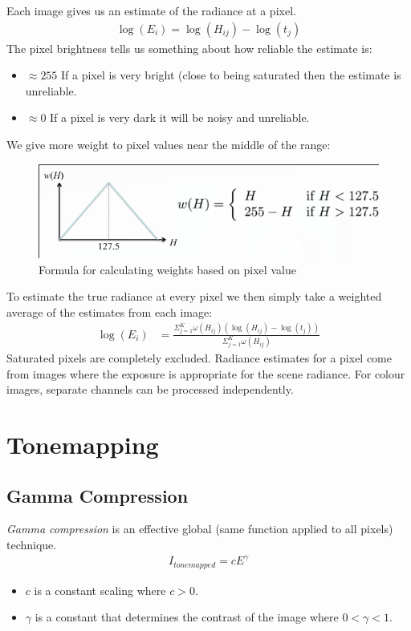 \documentclass{article}
\begin{document}
Each image gives us an estimate of the radiance at a pixel.
\begin{align*}
	\log(E_i) = \log(H_{ij}) - \log(t_j)
\end{align*}
The pixel brightness tells us something about how reliable the estimate is:
\begin{itemize}
	\item $\approx 255$ If a pixel is very bright (close to being saturated then the estimate is unreliable.
	\item $\approx 0$ If a pixel is very dark it will be noisy and unreliable. 
\end{itemize}
We give more weight to pixel values near the middle of the range:
\begin{figure}[!h]
	\includegraphics [width=\textwidth]{hdrweights.png}
	\caption{Formula for calculating weights based on pixel value}
	\label{Fig:hdrweights}
\end{figure}
To estimate the true radiance at every pixel we then simply take a weighted average of the estimates from each image:
\begin{align*}
	\log(E_i) &= \frac{\Sigma^K_{j=1}\omega(H_{ij})(\log(H_{ij})-\log(t_j))}
	{\Sigma^K_{j=1}\omega(H_{ij})}
\end{align*}
Saturated pixels are completely excluded. Radiance estimates for a pixel come from images where the exposure is appropriate for the scene radiance.
For colour images, separate channels can be processed independently.

\section{Tonemapping}
\subsection{Gamma Compression}
{\it Gamma compression} is an effective global (same function applied to all pixels) technique.
\begin{align*}
	I_{tonemapped} = cE^\gamma
\end{align*}
\begin{itemize}
	\item $c$ is a constant scaling where $c>0$.
	\item $\gamma$ is a constant that determines the contrast of the image where $0<\gamma<1$.
\end{itemize}
\end{document}
